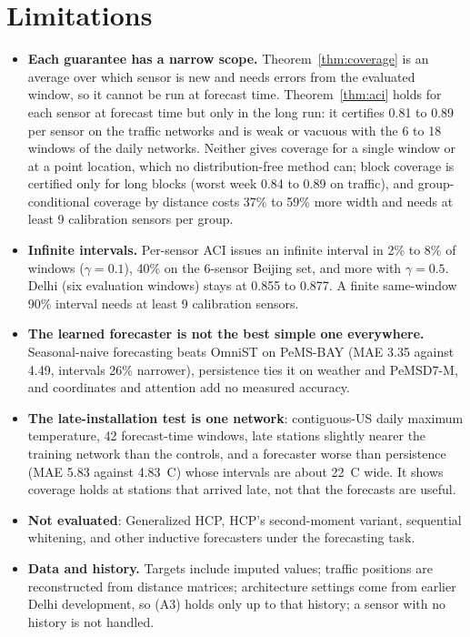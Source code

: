 \documentclass[journal,twoside,web]{ieeecolor}
\begin{document}
\section{Limitations}
\label{sec:limitations}
\begin{itemize}
\item \textbf{Each guarantee has a narrow scope.} Theorem~\ref{thm:coverage} is an average over which sensor is
new and needs errors from the evaluated window, so it cannot be run at forecast time. Theorem~\ref{thm:aci} holds
for each sensor at forecast time but only in the long run: it certifies 0.81 to 0.89 per sensor on the traffic
networks and is weak or vacuous with the 6 to 18 windows of the daily networks. Neither gives coverage for a single
window or at a point location, which no distribution-free method can; block coverage is certified only for long
blocks (worst week 0.84 to 0.89 on traffic), and group-conditional coverage by distance costs 37\% to 59\% more width
and needs at least 9 calibration sensors per group.

\item \textbf{Infinite intervals.} Per-sensor ACI issues an infinite interval in 2\% to 8\% of windows
($\gamma=0.1$), 40\% on the 6-sensor Beijing set, and more with $\gamma=0.5$. Delhi (six evaluation windows) stays at 0.855 to 0.877. A finite same-window 90\% interval needs at least 9 calibration sensors.
\item \textbf{The learned forecaster is not the best simple one everywhere.} Seasonal-naive forecasting
beats OmniST on PeMS-BAY (MAE 3.35 against 4.49, intervals 26\% narrower), persistence ties it on weather
and PeMSD7-M, and coordinates and attention add no measured accuracy. 
\item \textbf{The late-installation test is one network}: contiguous-US daily maximum temperature, 42 forecast-time
windows, late stations slightly nearer the training network than the controls, and a forecaster worse than
persistence (MAE 5.83 against 4.83~\textdegree C) whose intervals are about 22~\textdegree C wide. It shows coverage
holds at stations that arrived late, not that the forecasts are useful.
\item \textbf{Not evaluated}: Generalized HCP, HCP's second-moment variant, sequential whitening, and other
inductive forecasters under the forecasting task.
\item \textbf{Data and history.} Targets include imputed values; traffic positions are reconstructed from distance matrices; architecture settings come from earlier Delhi development, so (A3) holds only up to that history; a sensor with no history is not handled.
\end{itemize}
\end{document}
